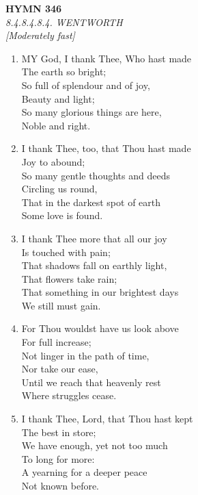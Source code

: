 \documentclass[11pt,a4paper]{article}
\begin{document}
\newpage
\begin{center}
    {\Large \textbf{HYMN 346}}
    \\
    \textit{8.4.8.4.8.4. WENTWORTH}
    \\
    \textit{\small [Moderately fast]}
\end{center}
\vspace{1em}

\begin{enumerate}
    \item MY God, I thank Thee, Who hast made \\
        The earth so bright; \\
        So full of splendour and of joy, \\
        Beauty and light; \\
        So many glorious things are here, \\
        Noble and right.

    \item I thank Thee, too, that Thou hast made \\
        Joy to abound; \\
        So many gentle thoughts and deeds \\
        Circling us round, \\
        That in the darkest spot of earth \\
        Some love is found.

    \item I thank Thee more that all our joy \\
        Is touched with pain; \\
        That shadows fall on earthly light, \\
        That flowers take rain; \\
        That something in our brightest days \\
        We still must gain.

    \item For Thou wouldst have us look above \\
        For full increase; \\
        Not linger in the path of time, \\
        Nor take our ease, \\
        Until we reach that heavenly rest \\
        Where struggles cease.

    \item I thank Thee, Lord, that Thou hast kept \\
        The best in store; \\
        We have enough, yet not too much \\
        To long for more: \\
        A yearning for a deeper peace \\
        Not known before.

\end{enumerate}
\end{document}

